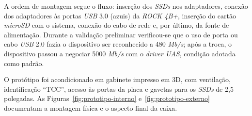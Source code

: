 \begin{figure}[H]
    \centering
    \fonteautoria
\end{figure}

\begin{figure}[H]
    \centering
    \hfill
    \fonteautoria
\end{figure}

A ordem de montagem segue o fluxo: inserção dos \textit{SSDs} nos adaptadores, conexão dos adaptadores às portas \textit{USB} 3.0 (azuis) da \textit{ROCK 4B+}, inserção do cartão \textit{microSD} com o sistema, conexão do cabo de rede e, por último, da fonte de alimentação. Durante a validação preliminar verificou-se que o uso de porta ou cabo \textit{USB} 2.0 fazia o dispositivo ser reconhecido a 480 \textit{Mb/s}; após a troca, o dispositivo passou a negociar 5000 \textit{Mb/s} com o \textit{driver UAS}, condição adotada como padrão.

O protótipo foi acondicionado em gabinete impresso em 3D, com ventilação, identificação ``TCC'', acesso às portas da placa e gavetas para os \textit{SSDs} de 2,5 polegadas. As Figuras~\ref{fig:prototipo-interno} e~\ref{fig:prototipo-externo} documentam a montagem física e o aspecto final da caixa.

\begin{figure}[H]
    \centering
    \hfill
    \fonteautoria
\end{figure}

\begin{figure}[H]
    \centering
    \hfill
    \fonteautoria
\end{figure}

